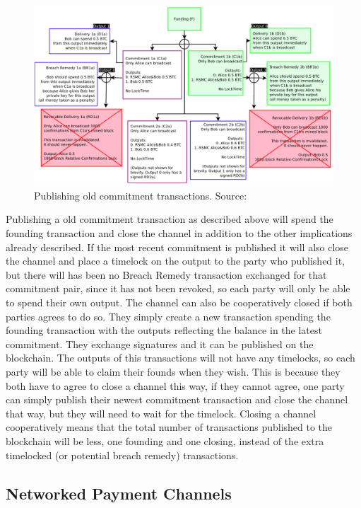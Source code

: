 \begin{figure}[ht]
    \centering
    \includegraphics[width=14cm]{figures/ln_breach.png}
    \caption{Publishing old commitment transactions. Source:~\cite{poon2015bitcoin}}
    \label{fig:ln_breach}
\end{figure}

Publishing a old commitment transaction as described above will spend the founding transaction and close the channel in addition to the other implications already described. If the most recent commitment is published it will also close the channel and place a timelock on the output to the party who published it, but there will has been no Breach Remedy transaction exchanged for that commitment pair, since it has not been revoked, so each party will only be able to spend their own output.
The channel can also be cooperatively closed if both parties agrees to do so. They simply create a new transaction spending the founding transaction with the outputs reflecting the balance in the latest commitment. They exchange signatures and it can be published on the blockchain. The outputs of this transactions will not have any timelocks, so each party will be able to claim their founds when they wish.
This is because they both have to agree to close a channel this way, if they cannot agree, one party can simply publish their newest commitment transaction and close the channel that way, but they will need to wait for the timelock.
Closing a channel cooperatively means that the total number of transactions published to the blockchain will be less, one founding and one closing, instead of the extra timelocked (or potential breach remedy) transactions.

\subsection{Networked Payment Channels}
\label{subsec:networkpcln}


